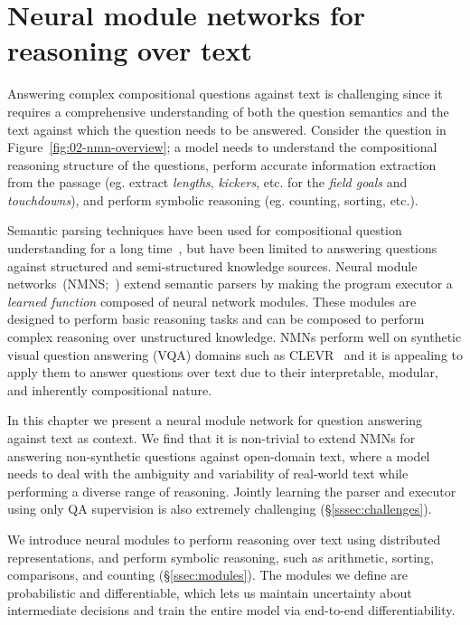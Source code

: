 \documentclass[main.tex]{subfiles}
\begin{document}
\section{Neural module networks for reasoning over text} %
\label{sec:nmn-drop}

Answering complex compositional questions against text is challenging since it requires a comprehensive understanding of both the question semantics and the text against which the question needs to be answered.
Consider the question in Figure~\ref{fig:02-nmn-overview}; a model needs to understand the compositional reasoning structure of the questions, perform accurate information extraction from the passage (eg. extract \textit{lengths}, \textit{kickers}, etc. for the \textit{field goals} and \textit{touchdowns}), and perform symbolic reasoning (eg. counting, sorting, etc.).

Semantic parsing techniques have been used for compositional question understanding for a long time~\cite{zelle-1996,zettlemoyer-pccg-2005,clarke-sp-2010,liang-dcs-2011}, but have been limited to answering questions against structured and semi-structured knowledge sources.
Neural module networks~(NMNS;~) extend semantic parsers by making the program executor a \emph{learned function} composed of neural network modules.
These modules are designed to perform basic reasoning tasks and can be composed to perform complex reasoning over unstructured knowledge.
NMNs perform well on synthetic visual question answering (VQA) domains such as CLEVR~\cite{clevr-2017} and it is appealing to apply them to answer questions over text due to their interpretable, modular, and inherently compositional nature.


In this chapter we present a neural module network for question answering against text as context.
We find that it is non-trivial to extend NMNs for answering non-synthetic questions against open-domain text, where a model needs to deal with the ambiguity and variability of real-world text while performing a diverse range of reasoning.  Jointly learning the parser and executor using only QA supervision is also extremely challenging (\S\ref{sssec:challenges}).

We introduce neural modules to perform reasoning over text using distributed representations, and perform symbolic reasoning, such as arithmetic, sorting, comparisons, and counting (\S\ref{ssec:modules}).
The modules we define are probabilistic and differentiable, which lets us maintain uncertainty about intermediate decisions and train the entire model via end-to-end differentiability.
\end{document}
